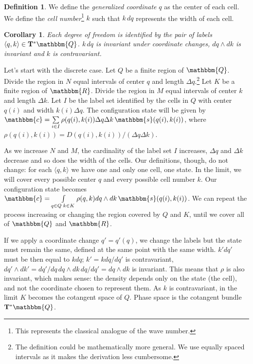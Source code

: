 \documentclass[aps,pra,10pt,twocolumn,floatfix,nofootinbib]{revtex4-1}
\newtheorem{cor}[thm]{Corollary}
\theoremstyle{definition}
\newtheorem{defn}[thm]{Definition}
\begin{document}
\begin{defn}\label{sdof}
We define the \emph{generalized coordinate} $q$ as the center of each cell. We define the \emph{cell number}\footnote{This represents the classical analogue of the wave number.} $k$ such that $k \, dq$ represents the width of each cell.
\end{defn}

\begin{cor}\label{continuousLabels}
Each degree of freedom is identified by the pair of labels $\langle q,k \rangle \in \mathbf{T}^*\mathbbm{Q}$. $k\,dq$ is invariant under coordinate changes, $dq\wedge dk$ is invariant and $k$ is contravariant.
\end{cor}

Let's start with the discrete case. Let $Q$ be a finite region of $\mathbbm{Q}$. Divide the region in $N$ equal intervals of center $q$ and length $\Delta q$.\footnote{The definition could be mathematically more general. We use equally spaced intervals as it makes the derivation less cumbersome.} Let $K$ be a finite region of $\mathbbm{R}$. Divide the region in $M$ equal intervals of center $k$ and length $\Delta k$. Let $I$ be the label set identified by the cells in $Q$ with center $q(i)$ and width $k(i) \Delta q$. The configuration state will be given by $\mathbbm{c}=\sum\limits_{i \in I} \rho(q(i), k(i)) \Delta q \Delta k \, \mathbbm{s}(q(i), k(i))$, where $\rho(q(i), k(i)) = D(q(i), k(i)) / (\Delta q \Delta k)$.

As we increase $N$ and $M$, the cardinality of the label set $I$ increases, $\Delta q$ and $\Delta k$ decrease and so does the width of the cells. Our definitions, though, do not change: for each $\langle q,k \rangle$ we have one and only one cell, one state. In the limit, we will cover every possible center $q$ and every possible cell number $k$. Our configuration state becomes $\mathbbm{c}=\int\limits_{q \in Q \; k\in K} \rho(q, k) dq \wedge dk \, \mathbbm{s}(q(i), k(i))$. We can repeat the process increasing or changing the region covered by $Q$ and $K$, until we cover all of $\mathbbm{Q}$ and $\mathbbm{R}$.

If we apply a coordinate change $q'=q'(q)$, we change the labels but the state must remain the same, defined at the same point with the same width. $k' dq'$ must be then equal to $k dq$; $k'= k dq / dq'$ is contravariant, $dq' \wedge dk'= dq'/dq \, dq \wedge dk \, dq/dq' = dq \wedge dk$ is invariant. This means that $\rho$ is also invariant, which makes sense: the density depends only on the state (the cell), and not the coordinate chosen to represent them. As $k$ is contravariant, in the limit $K$ becomes the cotangent space of $Q$. Phase space is the cotangent bundle $\mathbf{T}^*\mathbbm{Q}$.
\end{document}
